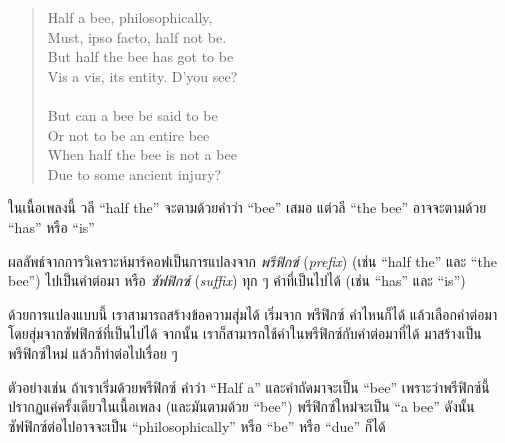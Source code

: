 \begin{quote}
Half a bee, philosophically, \\
Must, ipso facto, half not be. \\
But half the bee has got to be \\
Vis a vis, its entity. D'you see? \\
\\
But can a bee be said to be \\
Or not to be an entire bee \\
When half the bee is not a bee \\
Due to some ancient injury? \\
\end{quote}
%
%
ในเนื้อเพลงนี้ วลี ``half the'' จะตามด้วยคำว่า ``bee'' เสมอ
แต่วลี ``the bee'' อาจจะตามด้วย 
``has'' หรือ ``is''

%
ผลลัพธ์จากการวิเคราะห์มาร์คอฟเป็นการแปลงจาก \textit{พรีฟิกซ์} (\textit{prefix})
(เช่น ``half the'' และ ``the bee'') ไปเป็นคำต่อมา หรือ \textit{ซัฟฟิกซ์} (\textit{suffix}) ทุก ๆ คำที่เป็นไปได้
(เช่น ``has'' และ ``is'')



ด้วยการแปลงแบบนี้ 
เราสามารถสร้างข้อความสุ่มได้
เริ่มจาก พรีฟิกซ์ คำไหนก็ได้ แล้วเลือกคำต่อมาโดยสุ่มจากซัฟฟิกซ์ที่เป็นไปได้
จากนั้น เราก็สามารถใช้คำในพรีฟิกซ์กับคำต่อมาที่ได้ มาสร้างเป็นพรีฟิกซ์ใหม่ แล้วก็ทำต่อไปเรื่อย ๆ


ตัวอย่างเช่น ถ้าเราเริ่มด้วยพรีฟิกซ์ คำว่า ``Half a''
และคำถัดมาจะเป็น ``bee'' เพราะว่าพรีฟิกซ์นี้ปรากฏแค่ครั้งเดียวในเนื้อเพลง (และมันตามด้วย ``bee'')
พรีฟิกซ์ใหม่จะเป็น ``a bee'' ดังนั้นซัฟฟิกซ์ต่อไปอาจจะเป็น
``philosophically'' หรือ ``be'' หรือ ``due'' ก็ได้


